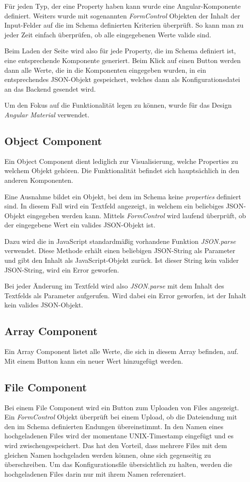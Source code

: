 Für jeden Typ, der eine Property haben kann wurde eine Angular-Komponente definiert.
Weiters wurde mit sogenannten \textit{FormControl} Objekten der Inhalt der Input-Felder auf die im Schema definierten
Kriterien überprüft.
So kann man zu jeder Zeit einfach überprüfen, ob alle eingegebenen Werte valide sind.

Beim Laden der Seite wird also für jede Property, die im Schema definiert ist, eine entsprechende Komponente generiert.
Beim Klick auf einen Button werden dann alle Werte, die in die Komponenten eingegeben wurden, in ein entsprechendes
JSON-Objekt gespeichert, welches dann als Konfigurationsdatei an das Backend gesendet wird.

Um den Fokus auf die Funktionalität legen zu können, wurde für das Design \textit{Angular Material} verwendet.

\subsection{Object Component}
Ein Object Component dient lediglich zur Visualisierung, welche Properties zu welchem Objekt gehören.
Die Funktionalität befindet sich hauptsächlich in den anderen Komponenten.

Eine Ausnahme bildet ein Objekt, bei dem im Schema keine \textit{properties} definiert sind.
In diesem Fall wird ein Textfeld angezeigt, in welchem ein beliebiges JSON-Objekt eingegeben werden kann.
Mittels \textit{FormControl} wird laufend überprüft, ob der eingegebene Wert ein valides JSON-Objekt ist.

Dazu wird die in JavaScript standardmäßig vorhandene Funktion \textit{JSON.parse} verwendet.
Diese Methode erhält einen beliebigen JSON-String als Parameter und gibt den Inhalt als JavaScript-Objekt zurück.
Ist dieser String kein valider JSON-String, wird ein Error geworfen.

Bei jeder Änderung im Textfeld wird also \textit{JSON.parse} mit dem Inhalt des Textfelds als Parameter aufgerufen.
Wird dabei ein Error geworfen, ist der Inhalt kein valides JSON-Objekt.

\subsection{Array Component}
Ein Array Component listet alle Werte, die sich in diesem Array befinden, auf.
Mit einem Button kann ein neuer Wert hinzugefügt werden.

\subsection{File Component}
Bei einem File Component wird ein Button zum Uploaden von Files angezeigt.
Ein \textit{FormControl} Objekt überprüft bei einem Upload, ob die Dateiendung mit den im Schema definierten
Endungen übereinstimmt.
In den Namen eines hochgeladenen Files wird der momentane UNIX-Timestamp eingefügt und es wird zwischengespeichert.
Das hat den Vorteil, dass mehrere Files mit dem gleichen Namen hochgeladen werden können, ohne sich gegenseitig zu
überschreiben.
Um das Konfigurationsfile übersichtlich zu halten, werden die hochgeladenen Files darin nur mit ihrem Namen referenziert.

